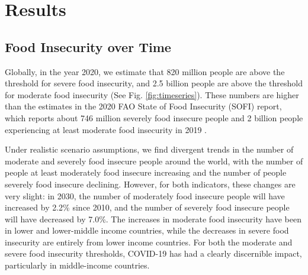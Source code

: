 \documentclass{article}
\begin{document}
\section{Results}
\subsection{Food Insecurity over Time}
Globally, in the year 2020, we estimate that 820 million people are above the threshold for severe food insecurity, and 2.5 billion people are above the threshold for moderate food insecurity (See Fig. \ref{fig:timeseries}). These numbers are higher than the estimates in the 2020 FAO State of Food Insecurity (SOFI) report, which reports about 746 million severely food insecure people and 2 billion people experiencing at least moderate food insecurity in 2019 \citep{sofi2020}. 

Under realistic scenario assumptions, we find divergent trends in the number of moderate and severely food insecure people around the world, with the number of people at least moderately food insecure increasing and the number of people severely food insecure declining.  However, for both indicators, these changes are very slight: in 2030, the number of moderately food insecure people will have increased by 2.2\% since 2010, and the number of severely food insecure people will have decreased by 7.0\%.  The increases in moderate food insecurity have been in lower and lower-middle income countries, while the decreases in severe food insecurity are entirely from lower income countries.  For both the moderate and severe food insecurity thresholds, COVID-19 has had a clearly discernible impact, particularly in middle-income countries.
\end{document}
